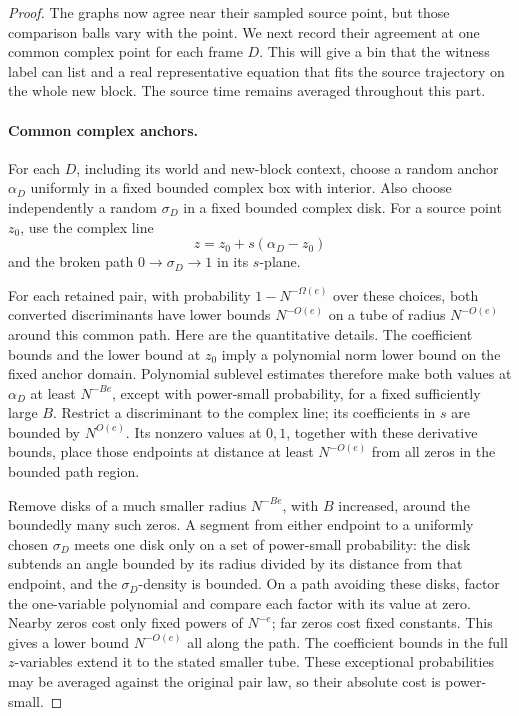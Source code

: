 \begin{proof}
The graphs now agree near their sampled source point, but those
comparison balls vary with the point.  We next record their agreement
at one common complex point for each frame \(D\).  This will give
a bin that the witness label can list and a real representative
equation that fits the source trajectory on the whole new block.
The source time remains averaged throughout this part.

\paragraph{Common complex anchors.}  For each \(D\), including its
world and new-block context, choose a random anchor
\(\alpha_D\) uniformly in a fixed bounded complex box with
interior.  Also choose independently a random
\(\sigma_D\) in a fixed bounded complex disk.
For a source point \(z_0\), use the complex line
\[
 z=z_0+s(\alpha_D-z_0)
\]
and the broken path \(0\longrightarrow\sigma_D
\longrightarrow1\) in its \(s\)-plane.

For each retained pair, with probability
\(1-N^{-\Omega(e)}\) over these choices, both converted
discriminants have lower bounds \(N^{-O(e)}\) on a tube
of radius \(N^{-O(e)}\) around this common path.
Here are the quantitative details.  The coefficient
bounds and the lower bound at \(z_0\) imply a polynomial
norm lower bound on the fixed anchor domain.  Polynomial
sublevel estimates therefore make both values at
\(\alpha_D\) at least \(N^{-B e}\), except with
power-small probability, for a fixed sufficiently large
\(B\).  Restrict a discriminant to the complex line; its
coefficients in \(s\) are bounded by \(N^{O(e)}\).
Its nonzero values at \(0,1\), together with these derivative
bounds, place those endpoints at distance at least
\(N^{-O(e)}\) from all zeros in the bounded path region.

Remove disks of a much smaller radius \(N^{-Be}\), with
\(B\) increased, around the boundedly many such zeros.
A segment from either endpoint to a uniformly chosen
\(\sigma_D\) meets one disk only on a set of power-small
probability: the disk subtends an angle bounded by its
radius divided by its distance from that endpoint, and
the \(\sigma_D\)-density is bounded.  On a path avoiding
these disks, factor the one-variable polynomial and compare
each factor with its value at zero.  Nearby zeros cost
only fixed powers of \(N^{-e}\); far zeros cost fixed
constants.  This gives a lower bound \(N^{-O(e)}\) all
along the path.  The coefficient bounds in the full
\(z\)-variables extend it to the stated smaller tube.
These exceptional probabilities may be averaged against
the original pair law, so their absolute cost is
power-small.


\end{proof}
